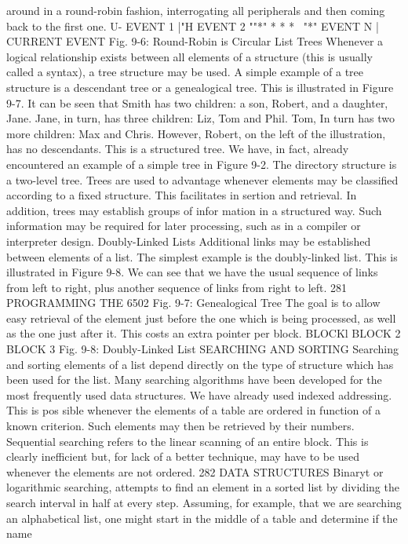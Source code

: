 \documentclass{book}
\begin{document}
{around in a round-robin fashion, interrogating all peripherals and
then coming back to the first one.
U- EVENT 1 |"H EVENT 2 ""*" * * * ~"*" EVENT N |
CURRENT EVENT
Fig. 9-6: Round-Robin is Circular List
Trees
Whenever a logical relationship exists between all elements of a
structure (this is usually called a syntax), a tree structure may be
used. A simple example of a tree structure is a descendant tree or a
genealogical tree. This is illustrated in Figure 9-7. It can be seen
that Smith has two children: a son, Robert, and a daughter, Jane.
Jane, in turn, has three children: Liz, Tom and Phil. Tom, In turn
has two more children: Max and Chris. However, Robert, on the
left of the illustration, has no descendants.
This is a structured tree. We have, in fact, already encountered
an example of a simple tree in Figure 9-2. The directory structure
is a two-level tree. Trees are used to advantage whenever elements
may be classified according to a fixed structure. This facilitates in
sertion and retrieval. In addition, trees may establish groups of infor
mation in a structured way. Such information may be required for later
processing, such as in a compiler or interpreter design.
Doubly-Linked Lists
Additional links may be established between elements of a list.
The simplest example is the doubly-linked list. This is illustrated
in Figure 9-8. We can see that we have the usual sequence of links
from left to right, plus another sequence of links from right to left.
281
PROGRAMMING THE 6502
Fig. 9-7: Genealogical Tree
The goal is to allow easy retrieval of the element just before the
one which is being processed, as well as the one just after it. This costs
an extra pointer per block.
BLOCKl BLOCK 2 BLOCK 3
Fig. 9-8: Doubly-Linked List
SEARCHING AND SORTING
Searching and sorting elements of a list depend directly on the
type of structure which has been used for the list. Many searching
algorithms have been developed for the most frequently used data
structures. We have already used indexed addressing. This is pos
sible whenever the elements of a table are ordered in function of a
known criterion. Such elements may then be retrieved by their
numbers.
Sequential searching refers to the linear scanning of an entire
block. This is clearly inefficient but, for lack of a better technique, may
have to be used whenever the elements are not ordered.
282
DATA STRUCTURES
Binaryt or logarithmic searching, attempts to find an element in a
sorted list by dividing the search interval in half at every step.
Assuming, for example, that we are searching an alphabetical list,
one might start in the middle of a table and determine if the name
}
\end{document}
